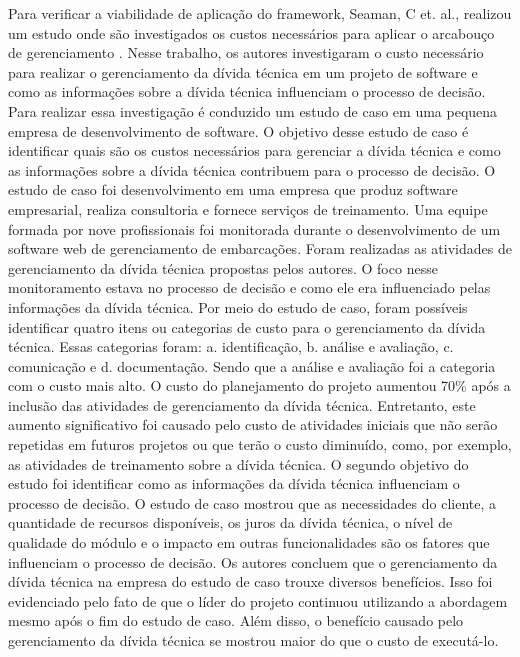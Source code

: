 Para verificar a viabilidade de aplicação do framework, Seaman, C et. al., realizou um estudo onde são investigados os custos necessários para aplicar o arcabouço de gerenciamento
 \cite{guo2016exploring}. Nesse trabalho, os autores investigaram o custo necessário para realizar o gerenciamento da dívida técnica em um projeto de software e como as informações sobre a dívida técnica influenciam o processo de decisão. Para realizar essa investigação é conduzido um estudo de caso em uma pequena empresa de desenvolvimento de software. O objetivo desse estudo de caso é identificar quais são os custos necessários para gerenciar a dívida técnica e como as informações sobre a dívida técnica contribuem para o processo de decisão.  O estudo de caso foi desenvolvimento em uma empresa que produz software empresarial, realiza consultoria e fornece serviços de treinamento. Uma equipe formada por nove profissionais foi monitorada durante o desenvolvimento de um software web de gerenciamento de embarcações. Foram realizadas as atividades de gerenciamento da dívida técnica propostas pelos autores. O foco nesse monitoramento estava no processo de decisão e como ele era influenciado pelas informações da dívida técnica. Por meio do estudo de caso, foram possíveis identificar quatro itens ou categorias de custo para o gerenciamento da dívida técnica. Essas categorias foram: a. identificação, b. análise e avaliação, c. comunicação e d. documentação. Sendo que a análise e avaliação foi a categoria com o custo mais alto. O custo do planejamento do projeto aumentou 70\% após a inclusão das atividades de gerenciamento da dívida técnica. Entretanto, este aumento significativo foi causado pelo custo de atividades iniciais que não serão repetidas em futuros projetos ou que terão o custo diminuído, como, por exemplo, as atividades de treinamento sobre a dívida técnica. O segundo objetivo do estudo foi identificar como as informações da dívida técnica influenciam o processo de decisão. O estudo de caso mostrou que as necessidades do cliente, a quantidade de recursos disponíveis, os juros da dívida técnica, o nível de qualidade do módulo e o impacto em outras funcionalidades são os fatores que influenciam o processo de decisão. Os autores concluem que o gerenciamento da dívida técnica na empresa do estudo de caso trouxe diversos benefícios. Isso foi evidenciado pelo fato de que o líder do projeto continuou utilizando a abordagem mesmo após o fim do estudo de caso. Além disso, o benefício causado pelo gerenciamento da dívida técnica se mostrou maior do que o custo de executá-lo. 

